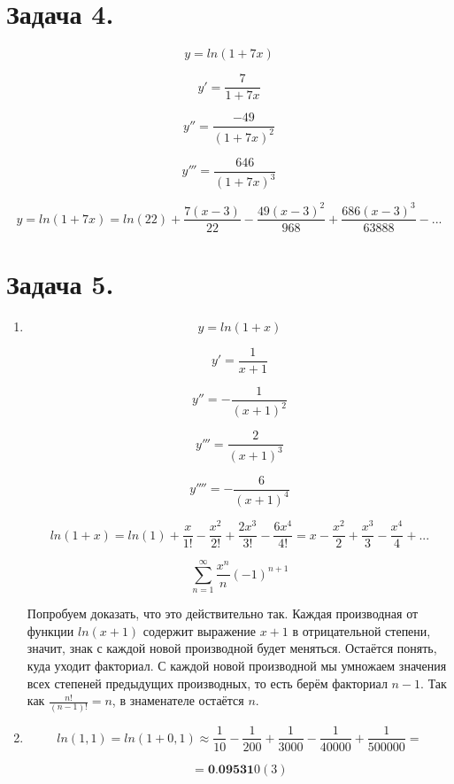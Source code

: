 \documentclass[a4paper,10pt]{article}
\begin{document}
\section{Задача 4.}

$$y = ln(1+7x)$$

$$y' = \frac{7}{1+7x}$$

$$y'' = \frac{-49}{(1+7x)^2}$$

$$y''' = \frac{646}{(1+7x)^3}$$

$$ y = ln(1+7x) = ln(22) + \frac{7(x-3)}{22} - \frac{49(x-3)^2}{968} 
+ \frac{686(x-3)^3}{63 888} - ... $$

\section{Задача 5.}

\begin{enumerate}[label=(\alph*)]
 \item
 $$y = ln(1+x)$$

 $$y' = \frac{1}{x+1}$$

 $$y'' = -\frac{1}{(x+1)^2} $$

 $$y''' = \frac{2}{(x+1)^3} $$
 
 $$y'''' = -\frac{6}{(x+1)^4}  $$
 
 $$ ln(1+x) = ln(1) + \frac{x}{1!} - \frac{x^2}{2!} + \frac{2x^3}{3!}
 - \frac{6x^4}{4!} = x - \frac{x^2}{2} + \frac{x^3}{3} - \frac{x^4}{4} + ...$$
 
 $$ \sum^{\infty}_{n=1} \frac{x^n}{n} (-1)^{n+1} $$
 
 Попробуем доказать, что это действительно так. Каждая производная от функции $ln(x+1)$ содержит выражение $x+1$ в отрицательной степени, значит, знак с каждой новой производной будет меняться. Остаётся понять, куда уходит факториал. С каждой новой производной мы умножаем значения всех степеней предыдущих производных, то есть берём факториал $n-1$. Так как $\frac{n!}{(n-1)!} = n$, в знаменателе остаётся $n$.
 \item
 $$ ln(1,1) = ln(1+0,1) \approx \frac{1}{10} - \frac{1}{200} + \frac{1}{3000}
 - \frac{1}{40 000} + \frac{1}{500 000} = $$

 $$ = \textbf{0.09531}0(3) $$
\end{enumerate}
\end{document}
